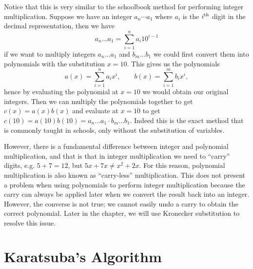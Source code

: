Notice that this is very similar to the schoolbook method for performing integer multiplication. Suppose we have an integer $a_n \cdots a_1$ where $a_i$ is the $i^\textrm{th}$ digit in the decimal representation, then we have
\[
    a_n \ldots a_1 = \sum^n_{i=1} a_i 10^{i-1}
\]
if we want to multiply integers $a_n\ldots a_1$ and $b_m\ldots b_1$ we could first convert them into polynomials with the substitution $x = 10$. This gives us the polynomials
\[
    a(x) = \sum^n_{i=1} a_ix^i, \qquad b(x) = \sum^m_{i=1} b_ix^i,
\]
hence by evaluating the polynomial at $x = 10$ we would obtain our original integers. Then we can multiply the polynomials together to get $c(x) = a(x)b(x)$ and evaluate at $x = 10$ to get $c(10) = a(10)b(10) = a_n\ldots a_1 \cdot b_m\ldots b_1$. Indeed this is the exact method that is commonly taught in schools, only without the substitution of variables.

However, there is a fundamental difference between integer and polynomial multiplication, and that is that in integer multiplication we need to ``carry'' digits, e.g. $5 + 7 = 12$, but $5x + 7x \neq x^2 + 2x$. For this reason, polynomial multiplication is also known as ``carry-less'' multiplication. This does not present a problem when using polynomials to perform integer multiplication because the carry can always be applied later when we convert the result back into an integer. However, the converse is not true; we cannot easily undo a carry to obtain the correct polynomial. Later in the chapter, we will use Kronecker substitution to resolve this issue.

\section{Karatsuba's Algorithm}
\label{sec:prelim-karatsuba}

